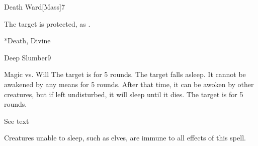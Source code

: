 \begin{spellsection}{Death Ward}[Mass]{7}
    \begin{spellheader}
    \end{spellheader}
    \begin{spellcontent}
        \begin{spelltargetinginfo}
        \end{spelltargetinginfo}
        \begin{spelleffects}
            \spelleffect The target is protected, as .
            \spelldur \durshort
        \end{spelleffects}
    \end{spellcontent}
    \begin{spellfooter}
        *{Death, Divine}
        \miscastexplode
    \end{spellfooter}
\end{spellsection}

\begin{spellsection}{Deep Slumber}{9}
    \begin{spellheader}
    \end{spellheader}
    \begin{spellcontent}
        \begin{spelltargetinginfo}
        \end{spelltargetinginfo}
        \begin{spelleffects}
            \begin{spellattack}{Magic vs. Will}
                \spellsuccess The target is \blinded for 5 rounds.
                \spellcritical The target falls asleep. It cannot be awakened by any means for 5 rounds. After that time, it can be awoken by other creatures, but if left undisturbed, it will sleep until it dies.
                \spellfailure The target is \dazed for 5 rounds.
            \end{spellattack}
            \spelldur See text
        \end{spelleffects}
    \end{spellcontent}
    \begin{spellfooter}
        \spellnotes Creatures unable to sleep, such as elves, are immune to all effects of this spell.
        \miscastrandom
    \end{spellfooter}
\end{spellsection}

